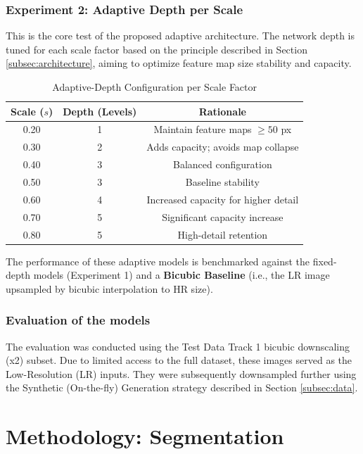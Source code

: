 \subsubsection{Experiment 2: Adaptive Depth per Scale}
This is the core test of the proposed adaptive architecture. The network depth is tuned for each scale factor based on the principle described in Section \ref{subsec:architecture}, aiming to optimize feature map size stability and capacity.

\begin{table}[h!]
    \centering
    \caption{Adaptive-Depth Configuration per Scale Factor}
    \label{tab:adaptive_depth}
    \begin{tabular}{|c|c|c|}
        \hline
        \textbf{Scale ($s$)} & \textbf{Depth (Levels)} & \textbf{Rationale} \\
        \hline
        0.20 & 1 & Maintain feature maps $\ge 50$ px \\
        0.30 & 2 & Adds capacity; avoids map collapse \\
        0.40 & 3 & Balanced configuration \\
        0.50 & 3 & Baseline stability \\
        0.60 & 4 & Increased capacity for higher detail \\
        0.70 & 5 & Significant capacity increase \\
        0.80 & 5 & High-detail retention \\
        \hline
    \end{tabular}
\end{table}

The performance of these adaptive models is benchmarked against the fixed-depth models (Experiment 1) and a \textbf{Bicubic Baseline} (i.e., the LR image upsampled by bicubic interpolation to HR size).


\subsubsection{Evaluation of the models} 

The evaluation was conducted using the Test Data Track 1 bicubic downscaling (x2) subset. Due to limited access to the full dataset, these images served as the Low-Resolution (LR) inputs. They were subsequently downsampled further using the Synthetic (On-the-fly) Generation strategy described in Section \ref{subsec:data}.

\section{Methodology: Segmentation}
\label{sec:methodology_segmentation}

